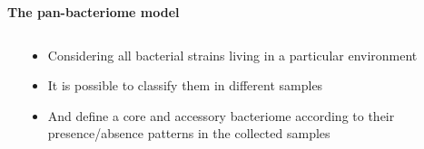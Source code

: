 \documentclass[10pt]{beamer}
\begin{document}
\begin{frame}
	\vspace{3mm}
	\begin{overlayarea}{\textwidth}{0.95\textheight}
	\textbf{\Large{The pan-bacteriome model}}
	\begin{columns}
		\begin{column}{0.5\textwidth}
			\begin{center}
			\end{center}
		\end{column}
		\begin{column}{0.6\textwidth}
			\begin{itemize}
				\item<1-> Considering all bacterial strains living in a particular environment
				\item<2-> It is possible to classify them in different samples
				\item<3-> And define a core and accessory bacteriome according to their presence/absence patterns in the collected samples
			\end{itemize}
		\end{column}
	\end{columns}
	\vspace{5mm}
	\end{overlayarea}
\end{frame}
\end{document}
